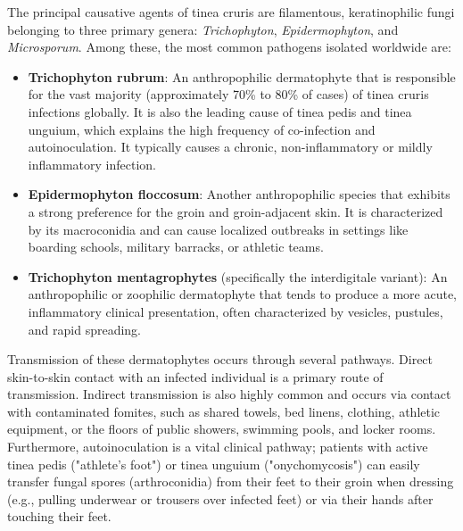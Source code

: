 The principal causative agents of tinea cruris are filamentous, keratinophilic fungi belonging to three primary genera: \textit{Trichophyton}, \textit{Epidermophyton}, and \textit{Microsporum}. Among these, the most common pathogens isolated worldwide are:
\begin{itemize}
    \item \textbf{Trichophyton rubrum}: An anthropophilic dermatophyte that is responsible for the vast majority (approximately 70\% to 80\% of cases) of tinea cruris infections globally. It is also the leading cause of tinea pedis and tinea unguium, which explains the high frequency of co-infection and autoinoculation. It typically causes a chronic, non-inflammatory or mildly inflammatory infection.
    \item \textbf{Epidermophyton floccosum}: Another anthropophilic species that exhibits a strong preference for the groin and groin-adjacent skin. It is characterized by its macroconidia and can cause localized outbreaks in settings like boarding schools, military barracks, or athletic teams.
    \item \textbf{Trichophyton mentagrophytes} (specifically the interdigitale variant): An anthropophilic or zoophilic dermatophyte that tends to produce a more acute, inflammatory clinical presentation, often characterized by vesicles, pustules, and rapid spreading.
\end{itemize}

Transmission of these dermatophytes occurs through several pathways. Direct skin-to-skin contact with an infected individual is a primary route of transmission. Indirect transmission is also highly common and occurs via contact with contaminated fomites, such as shared towels, bed linens, clothing, athletic equipment, or the floors of public showers, swimming pools, and locker rooms. Furthermore, autoinoculation is a vital clinical pathway; patients with active tinea pedis ("athlete's foot") or tinea unguium ("onychomycosis") can easily transfer fungal spores (arthroconidia) from their feet to their groin when dressing (e.g., pulling underwear or trousers over infected feet) or via their hands after touching their feet.

